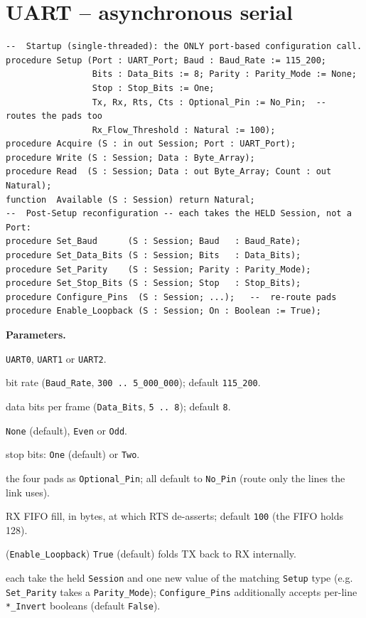 \section{UART -- asynchronous serial}

\begin{lstlisting}
--  Startup (single-threaded): the ONLY port-based configuration call.
procedure Setup (Port : UART_Port; Baud : Baud_Rate := 115_200;
                 Bits : Data_Bits := 8; Parity : Parity_Mode := None;
                 Stop : Stop_Bits := One;
                 Tx, Rx, Rts, Cts : Optional_Pin := No_Pin;  --  routes the pads too
                 Rx_Flow_Threshold : Natural := 100);
procedure Acquire (S : in out Session; Port : UART_Port);
procedure Write (S : Session; Data : Byte_Array);
procedure Read  (S : Session; Data : out Byte_Array; Count : out Natural);
function  Available (S : Session) return Natural;
--  Post-Setup reconfiguration -- each takes the HELD Session, not a Port:
procedure Set_Baud      (S : Session; Baud   : Baud_Rate);
procedure Set_Data_Bits (S : Session; Bits   : Data_Bits);
procedure Set_Parity    (S : Session; Parity : Parity_Mode);
procedure Set_Stop_Bits (S : Session; Stop   : Stop_Bits);
procedure Configure_Pins  (S : Session; ...);   --  re-route pads
procedure Enable_Loopback (S : Session; On : Boolean := True);
\end{lstlisting}

\textbf{Parameters.}
\begin{description}[style=nextline]
\item[\texttt{Port}] \texttt{UART0}, \texttt{UART1} or \texttt{UART2}.
\item[\texttt{Baud}] bit rate (\texttt{Baud\_Rate}, \texttt{300\,..\,5\_000\_000});
  default \texttt{115\_200}.
\item[\texttt{Bits}] data bits per frame (\texttt{Data\_Bits}, \texttt{5\,..\,8});
  default \texttt{8}.
\item[\texttt{Parity}] \texttt{None} (default), \texttt{Even} or \texttt{Odd}.
\item[\texttt{Stop}] stop bits: \texttt{One} (default) or \texttt{Two}.
\item[\texttt{Tx}, \texttt{Rx}, \texttt{Rts}, \texttt{Cts}] the four pads as
  \texttt{Optional\_Pin}; all default to \texttt{No\_Pin} (route only the lines the
  link uses).
\item[\texttt{Rx\_Flow\_Threshold}] RX FIFO fill, in bytes, at which RTS
  de-asserts; default \texttt{100} (the FIFO holds 128).
\item[\texttt{On}] (\texttt{Enable\_Loopback}) \texttt{True} (default) folds TX back
  to RX internally.
\item[the \texttt{Set\_*} setters] each take the held \texttt{Session} and one new
  value of the matching \texttt{Setup} type (e.g. \texttt{Set\_Parity} takes a
  \texttt{Parity\_Mode}); \texttt{Configure\_Pins} additionally accepts per-line
  \texttt{*\_Invert} booleans (default \texttt{False}).
\end{description}


